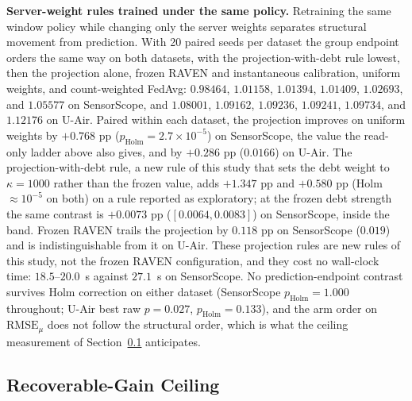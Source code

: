 \documentclass[letterpaper,journal]{IEEEtran}
\begin{document}
\noindent\textbf{Server-weight rules trained under the same policy.}
Retraining the same window policy while changing only the server weights
separates structural movement from prediction.  With 20 paired seeds per dataset
the group endpoint orders the same way on both datasets, with the
projection-with-debt rule lowest, then the projection alone, frozen RAVEN and
instantaneous calibration, uniform weights, and count-weighted FedAvg: $0.98464$,
$1.01158$, $1.01394$, $1.01409$, $1.02693$, and $1.05577$ on SensorScope, and
$1.08001$, $1.09162$, $1.09236$, $1.09241$, $1.09734$, and $1.12176$ on U-Air.
Paired within each dataset, the projection improves on uniform weights by
$+0.768$ pp ($p_{\mathrm{Holm}}=2.7\times10^{-5}$) on SensorScope, the value the
read-only ladder above also gives, and by $+0.286$ pp ($0.0166$) on U-Air.  The
projection-with-debt rule, a new rule of this study that sets the debt weight to
$\kappa=1000$ rather than the frozen value, adds $+1.347$ pp and $+0.580$ pp
(Holm $\approx10^{-5}$ on both) on a rule reported as exploratory; at the frozen
debt strength the same contrast is $+0.0073$ pp ($[0.0064,0.0083]$) on
SensorScope, inside the band.
Frozen RAVEN trails the projection by $0.118$ pp on SensorScope ($0.019$) and is
indistinguishable from it on U-Air.  These projection rules are new rules of
this study, not the frozen RAVEN configuration, and they cost no wall-clock time:
$18.5$--$20.0$~s against $27.1$~s on SensorScope.  No prediction-endpoint
contrast survives Holm correction on either dataset (SensorScope
$p_{\mathrm{Holm}}=1.000$ throughout; U-Air best raw $p=0.027$,
$p_{\mathrm{Holm}}=0.133$), and the arm order on $\mathrm{RMSE}_{\mu}$ does not
follow the structural order, which is what the ceiling measurement of
Section~\ref{subsec:ceiling} anticipates.

\subsection{Recoverable-Gain Ceiling}
\label{subsec:ceiling}
\end{document}
